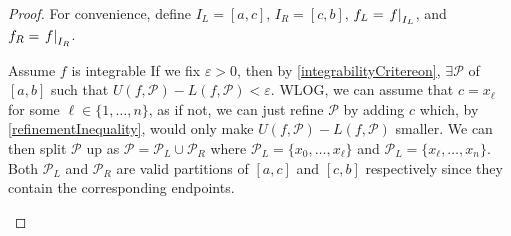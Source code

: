 \documentclass[../main.tex]{subfiles}
\begin{document}
\begin{proof}
  For convenience, define $I_L = [a, c]$, $I_R = [c, b]$, $f_L = \left. f \right|_{I_L}$, and $f_R = \left. f \right|_{I_R}$.
  \begin{proofdirection}{Assume $f$ is integrable}
    If we fix $\varepsilon > 0$, then by \cref{integrabilityCritereon}, $\exists \mathcal{P}$ of $[a, b]$ such that $U(f, \mathcal{P}) - L(f, \mathcal{P}) < \varepsilon$.
    WLOG, we can assume that $c = x_{\ell}$ for some $\ell \in \{1, \ldots, n\}$, as if not, we can just refine $\mathcal{P}$ by adding $c$ which, by \cref{refinementInequality}, would only make $U(f, \mathcal{P}) - L(f, \mathcal{P})$ smaller.
    We can then split $\mathcal{P}$ up as $\mathcal{P} = \mathcal{P}_L \cup \mathcal{P}_R$ where $\mathcal{P}_L = \{x_0, \ldots, x_{\ell}\}$ and $\mathcal{P}_L = \{x_{\ell}, \ldots, x_n\}$.
    Both $\mathcal{P}_L$ and $\mathcal{P}_R$ are valid partitions of $[a, c]$ and $[c, b]$ respectively since they contain the corresponding endpoints.


\end{proofdirection}
\end{proof}
\end{document}
